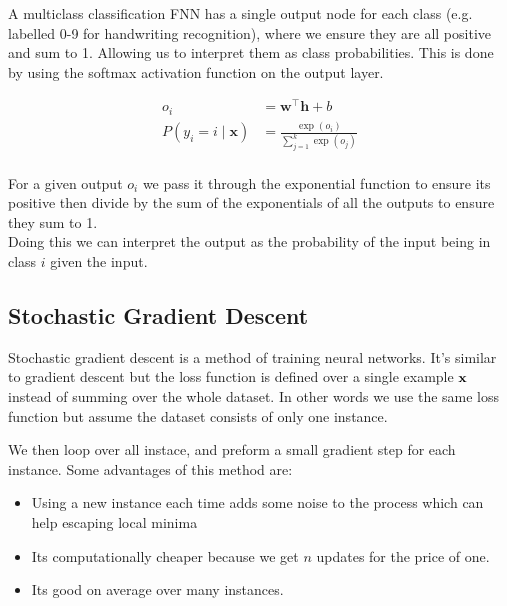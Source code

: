 \documentclass[12pt]{article}
\begin{document}
\begin{definition}
    A multiclass classification FNN has a single output node for each class (e.g. labelled 0-9 for handwriting recognition), where we ensure they are all positive and sum to 1. Allowing us to interpret them as class probabilities. This is done by using the softmax activation function on the output layer.
    \begin{multicols}{2}
        \begin{align*}
            o_i & = \mathbf w^\intercal \mathbf h + b \\ 
            P(y_i = i\mid \mathbf{x}) & = \frac{\exp (o_i)}{\sum_{j=1}^k \exp(o_j)}
        \end{align*}
        \columnbreak \\ 
        For a given output $o_i$ we pass it through the exponential function to ensure its positive then divide by the sum of the exponentials of all the outputs to ensure they sum to 1. \\ 
        Doing this we can interpret the output as the probability of the input being in class $i$ given the input.
    \end{multicols}
\end{definition}

\subsection{Stochastic Gradient Descent}
\begin{definition}
    Stochastic gradient descent is a method of training neural networks. It's similar to gradient descent but the loss function is defined over a single example $\mathbf{x}$ instead of summing over the whole dataset. In other words we use the same loss function but assume the dataset consists of only one instance.
\end{definition}

We then loop over all instace, and preform a small gradient step for each instance. Some advantages of this method are:
\begin{itemize}[leftmargin=*, noitemsep]
    \item Using a new instance each time adds some noise to the process which can help escaping local minima
    \item Its computationally cheaper because we get $n$ updates for the price of one. 
    \item Its good on average over many instances.
\end{itemize}
\end{document}
